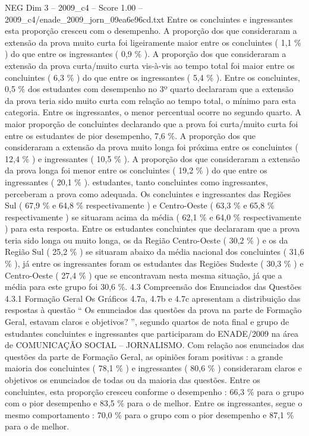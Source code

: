 \begin{textsample}{NEG Dim 3 – 2009\_c4 – Score 1.00 – 2009\_c4/enade\_2009\_jorn\_09ea6e96cd.txt}
Entre os concluintes e ingressantes esta proporção cresceu com o desempenho.
A proporção dos que consideraram a extensão da prova muito curta foi ligeiramente maior entre os concluintes ( 1,1 \% ) do que entre os ingressantes ( 0,9 \% ).
A proporção dos que consideraram a extensão da prova curta/muito curta vis-à-vis ao tempo total foi maior entre os concluintes ( 6,3 \% ) do que entre os ingressantes ( 5,4 \% ).
Entre os concluintes, 0,5 \% dos estudantes com desempenho no 3º quarto declararam que a extensão da prova teria sido muito curta com relação ao tempo total, o mínimo para esta categoria.
Entre os ingressantes, o menor percentual ocorre no segundo quarto.
A maior proporção de concluintes declarando que a prova foi curta/muito curta foi entre os estudantes de pior desempenho, 7,6 \%.
A proporção dos que consideraram a extensão da prova muito longa foi próxima entre os concluintes ( 12,4 \% ) e ingressantes ( 10,5 \% ).
A proporção dos que consideraram a extensão da prova longa foi menor entre os concluintes ( 19,2 \% ) do que entre os ingressantes ( 20,1 \% ). estudantes, tanto concluintes como ingressantes, perceberam a prova como adequada.
Os concluintes e ingressantes das Regiões Sul ( 67,9 \% e 64,8 \% respectivamente ) e Centro-Oeste ( 63,3 \% e 65,8 \% respectivamente ) se situaram acima da média ( 62,1 \% e 64,0 \% respectivamente ) para esta resposta.
Entre os estudantes concluintes que declararam que a prova teria sido longa ou muito longa, os da Região Centro-Oeste ( 30,2 \% ) e os da Região Sul ( 25,2 \% ) se situaram abaixo da média nacional dos concluintes ( 31,6 \% ), já entre os ingressantes foram os estudantes das Regiões Sudeste ( 30,3 \% ) e Centro-Oeste ( 27,4 \% ) que se encontravam nesta mesma situação, já que a média para este grupo foi 30,6 \%. 4.3 Compreensão dos Enunciados das Questões 4.3.1 Formação Geral Os Gráficos 4.7a, 4.7b e 4.7c apresentam a distribuição das respostas à questão “ Os enunciados das questões da prova na parte de Formação Geral, estavam claros e objetivos? ”, segundo quartos de nota final e grupo de estudantes concluintes e ingressantes que participaram do ENADE/2009 na área de COMUNICAÇÃO SOCIAL – JORNALISMO.
Com relação aos enunciados das questões da parte de Formação Geral, as opiniões foram positivas : a grande maioria dos concluintes ( 78,1 \% ) e ingressantes ( 80,6 \% ) consideraram claros e objetivos os enunciados de todas ou da maioria das questões.
Entre os concluintes, esta proporção cresceu conforme o desempenho : 66,3 \% para o grupo com o pior desempenho e 83,5 \% para o de melhor.
Entre os ingressantes, segue o mesmo comportamento : 70,0 \% para o grupo com o pior desempenho e 87,1 \% para o de melhor.

\end{textsample}
